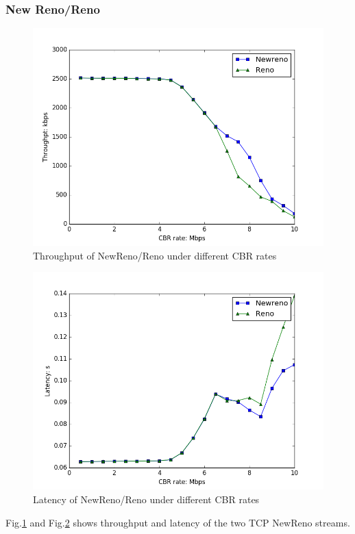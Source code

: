 \documentclass[10pt, conference]{IEEEtran/IEEEtran}
\begin{document}
\subsubsection{New Reno/Reno}
\begin{figure}[!ht]
\begin{center}
\includegraphics[width=\linewidth]{../exp2/exp2_Newreno_Reno_thpt.png}
\caption{Throughput of NewReno/Reno under different CBR rates}
\label{exp2_NewReno_Reno_thpt}
\end{center}
\end{figure}
\begin{figure}[!ht]
\begin{center}
\includegraphics[width=\linewidth]{../exp2/exp2_Newreno_Reno_lat.png}
\caption{Latency of NewReno/Reno under different CBR rates}
\label{exp2_NewReno_Reno_lat}
\end{center}
\end{figure}
Fig.\ref{exp2_NewReno_Reno_thpt} and Fig.\ref{exp2_NewReno_Reno_lat} shows throughput and latency of the two TCP NewReno streams. 
\end{document}
